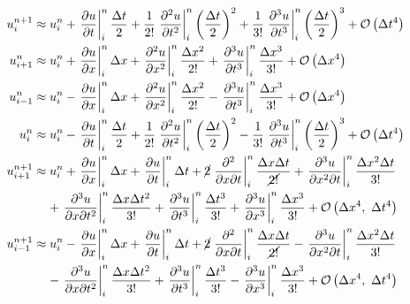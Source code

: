 \documentclass[addpoints]{exam}
\newcommand{\BigO}[1]{\mathcal{O}\left( #1\right)}
\newcommand{\D}[1]{\left. #1 \right|_{i}^{n}}
\begin{document}
\begin{questions}
\begin{parts}
\begin{solution}
\begin{align}
u_{i}^{n+1} &\approx u_{i}^{n}+\D{\frac{\partial u}{\partial t}}\frac{\Delta t}{2} + \frac{1}{2!}\D{\frac{\partial^{2}u}{\partial t^{2}}}\left( \frac{\Delta t}{2}\right)^{2}+\frac{1}{3!}\D{\frac{\partial ^{3}u}{\partial t^{3}}}\left( \frac{\Delta t}{2}\right)^{3} + \BigO{\Delta t^{4}}\label{eq:uin1}\\
u_{i+1}^{n} &\approx u_{i}^{n} + \D{\frac{\partial u}{\partial x}}\Delta x + \D{\frac{\partial ^{2} u}{\partial x^{2}}}\frac{\Delta x^{2}}{2!} + \D{\frac{\partial ^{3}u}{\partial t^{3}}}\frac{\Delta x^{3}}{3!} + \BigO{\Delta x^{4}}\label{eq:ui1n}\\
u_{i-1}^{n} &\approx u_{i}^{n} - \D{\frac{\partial u}{\partial x}}\Delta x + \D{\frac{\partial ^{2} u}{\partial x^{2}}}\frac{\Delta x^{2}}{2!} - \D{\frac{\partial ^{3}u}{\partial t^{3}}}\frac{\Delta x^{3}}{3!} + \BigO{\Delta x^{4}}\label{eq:ui_1n}\\
u_{i}^{n} &\approx u_{i}^{n} - \D{\frac{\partial u}{\partial t}}\frac{\Delta t}{2} + \frac{1}{2!}\D{\frac{\partial ^{2}u}{\partial t^{2}}}\left( \frac{\Delta t}{2}\right)^{2} - \frac{1}{3!}\D{\frac{\partial ^{3}u}{\partial t^{3}}}\left( \frac{\Delta t}{2}\right)^{3} + \BigO{\Delta t^{4}}\label{eq:uin}\\
u_{i+1}^{n+1} &\approx u_{i}^{n} + \D{\frac{\partial u}{\partial x}}\Delta x + \D{\frac{\partial u}{\partial t}}\Delta t + \cancel{2}\D{\frac{\partial ^{2}}{\partial x \partial t}}\frac{\Delta x\Delta t}{\cancel{2!}} + \D{\frac{\partial ^{3}u}{\partial x^{2}\partial t}}\frac{\Delta x^{2}\Delta t}{3!}\nonumber\\
       & \phantom{u_{i}^{n}} + \D{\frac{\partial ^{3}u}{\partial x\partial t^{2}}}\frac{\Delta x\Delta t^{2}}{3!} + \D{\frac{\partial ^{3}u}{\partial t^{3}}}\frac{\Delta t^{3}}{3!} + \D{\frac{\partial^{3} u}{\partial x^{3}}}\frac{\Delta x^{3}}{3!} + \BigO{\Delta x^{4},\ \Delta t^{4}}\label{eq:ui1n1}\\
u_{i-1}^{n+1} &\approx u_{i}^{n} - \D{\frac{\partial u}{\partial x}}\Delta x + \D{\frac{\partial u}{\partial t}}\Delta t + \cancel{2}\D{\frac{\partial ^{2}}{\partial x \partial t}}\frac{\Delta x\Delta t}{\cancel{2!}} - \D{\frac{\partial ^{3}u}{\partial x^{2}\partial t}}\frac{\Delta x^{2}\Delta t}{3!}\nonumber\\
       & \phantom{u_{i}^{n}} - \D{\frac{\partial ^{3}u}{\partial x\partial t^{2}}}\frac{\Delta x\Delta t^{2}}{3!} + \D{\frac{\partial ^{3}u}{\partial t^{3}}}\frac{\Delta t^{3}}{3!} - \D{\frac{\partial^{3} u}{\partial x^{3}}}\frac{\Delta x^{3}}{3!} + \BigO{\Delta x^{4},\ \Delta t^{4}}\label{eq:ui_1n1}

\end{align}
\end{solution}
\end{parts}
\end{questions}
\end{document}
